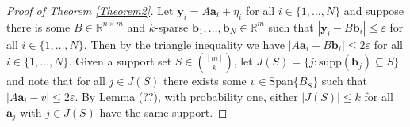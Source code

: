 \documentclass[journal, onecolumn]{IEEEtran}
\begin{document}
\begin{proof}[Proof of Theorem \ref{Theorem2}]
Let $\mathbf{y}_i = A\mathbf{a}_i + \eta_i$ for all $i \in \{1, \ldots, N\}$ and suppose there is some $B \in \mathbb{R}^{n \times m}$ and $k$-sparse $\mathbf{b}_1, \ldots, \mathbf{b}_N \in \mathbb{R}^m$ such that $|\mathbf{y}_i - B\mathbf{b}_i| \leq \varepsilon$ for all $i \in \{1, \ldots, N\}$. Then by the triangle inequality we have $|A\mathbf{a}_i - B\mathbf{b}_i| \leq 2\varepsilon$ for all $i \in \{1, \ldots, N\}$. Given a support set $S \in {[m]\choose k}$, let $J(S) = \{j: \text{supp}(\mathbf{b}_j) \subseteq S\}$ and note that for all $j \in J(S)$ there exists some $v \in \text{Span}\{B_S\}$ such that $|A\mathbf{a}_i - v| \leq 2\varepsilon$. By Lemma (??), with probability one, either $|J(S)| \leq k$ for all $\mathbf{a}_j$ with $j \in J(S)$ have the same support.
\end{proof}
\end{document}
